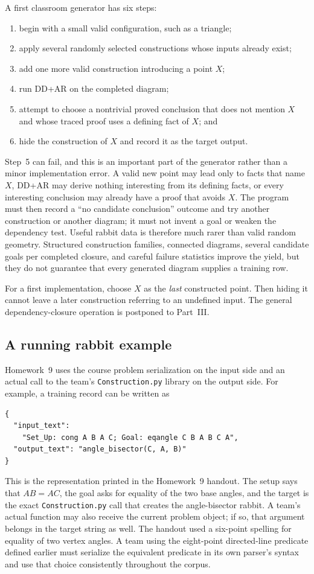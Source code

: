 \documentclass[reqno]{amsart}
\DeclareMathOperator{\1}{\textbf{1}}
\begin{document}
A first classroom generator has six steps:
\begin{enumerate}
    \item begin with a small valid configuration, such as a triangle;
    \item apply several randomly selected constructions whose inputs already
          exist;
    \item add one more valid construction introducing a point $X$;
    \item run DD+AR on the completed diagram;
    \item attempt to choose a nontrivial proved conclusion that does not
          mention $X$ and whose traced proof uses a defining fact of $X$; and
    \item hide the construction of $X$ and record it as the target output.
\end{enumerate}

Step~5 can fail, and this is an important part of the generator rather than a
minor implementation error. A valid new point may lead only to facts that name
$X$, DD+AR may derive nothing interesting from its defining facts, or every
interesting conclusion may already have a proof that avoids $X$. The program
must then record a ``no candidate conclusion'' outcome and try another
construction or another diagram; it must not invent a goal or weaken the
dependency test. Useful rabbit data is therefore much rarer than valid random
geometry. Structured construction families, connected diagrams, several
candidate goals per completed closure, and careful failure statistics improve
the yield, but they do not guarantee that every generated diagram supplies a
training row.

For a first implementation, choose $X$ as the \emph{last} constructed point.
Then hiding it cannot leave a later construction referring to an undefined
input. The general dependency-closure operation is postponed to Part~III.

\subsection*{A running rabbit example}

Homework~9 uses the course problem serialization on the input side and an
actual call to the team's \texttt{Construction.py} library on the output side.
For example, a training record can be written as
\begin{lstlisting}
{
  "input_text":
    "Set_Up: cong A B A C; Goal: eqangle C B A B C A",
  "output_text": "angle_bisector(C, A, B)"
}
\end{lstlisting}
This is the representation printed in the Homework~9 handout. The setup says
that $AB=AC$, the goal asks for equality of the two base angles, and the target
is the exact \texttt{Construction.py} call that creates the angle-bisector
rabbit. A team's actual function may also receive the current problem object;
if so, that argument belongs in the target string as well. The handout used a
six-point spelling for equality of two vertex angles. A team using the
eight-point directed-line predicate defined earlier must serialize the
equivalent predicate in its own parser's syntax and use that choice
consistently throughout the corpus.
\end{document}
